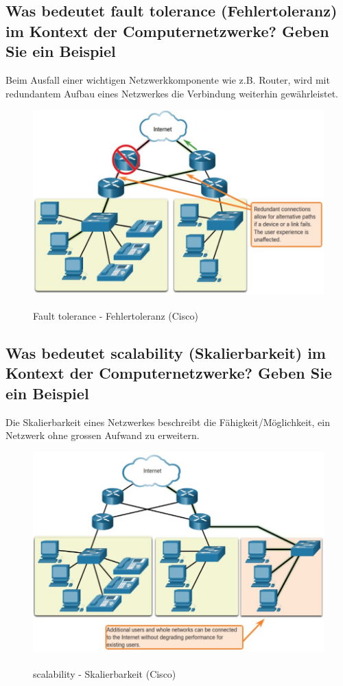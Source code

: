 \subsection*{Was bedeutet \flqq fault tolerance\frqq{} (Fehlertoleranz) im Kontext der Computernetzwerke? Geben Sie ein Beispiel}
Beim Ausfall einer wichtigen Netzwerkkomponente wie z.B. Router, wird mit redundantem Aufbau eines Netzwerkes die Verbindung weiterhin gewährleistet.
\begin{figure}[H]
    \begin{center}
    \label{pic:fault_tolerance}
    \includegraphics[width=\textwidth]{images/fault_tolerance.jpg}
    \caption{Fault tolerance - Fehlertoleranz (\textsuperscript{\textcopyright}Cisco)}
    \end{center}
\end{figure}
\pagebreak
\subsection*{Was bedeutet \flqq scalability\frqq{} (Skalierbarkeit) im Kontext der Computernetzwerke? Geben Sie ein Beispiel}
Die Skalierbarkeit eines Netzwerkes beschreibt die Fähigkeit/Möglichkeit, ein Netzwerk ohne grossen Aufwand zu erweitern.
\begin{figure}[H]
    \begin{center}
    \label{pic:scalability}
    \includegraphics[width=\textwidth]{images/scalability.jpg}
    \caption{scalability - Skalierbarkeit (\textsuperscript{\textcopyright}Cisco)}
    \end{center}
\end{figure}
